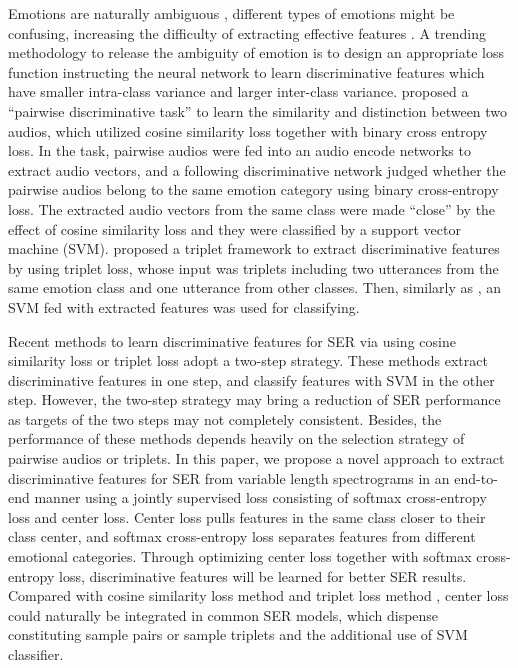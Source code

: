 \documentclass{article}
\begin{document}
Emotions are naturally ambiguous \cite{mower2009interpreting}, different types of emotions might be confusing, increasing the difficulty of extracting effective features \cite{chao2016long}. A trending methodology to release the ambiguity of emotion is to design an appropriate loss function instructing the neural network to learn discriminative features which have smaller intra-class variance and larger inter-class variance. \cite{lian2018pairwise} proposed a ``pairwise discriminative task'' to learn the similarity and distinction between two audios, which utilized cosine similarity loss together with binary cross entropy loss. In the task, pairwise audios were fed into an audio encode networks to extract audio vectors, and a following discriminative network judged whether the pairwise audios belong to the same emotion category using binary cross-entropy loss. The extracted audio vectors from the same class were made ``close'' by the effect of cosine similarity loss and they were classified by a support vector machine ({SVM}). \cite{huang2018speech} proposed a triplet framework to extract discriminative features by using triplet loss\cite{schroff2015facenet}, whose input was triplets including two utterances from the same emotion class and one utterance from other classes. Then, similarly as \cite{lian2018pairwise}, an SVM fed with extracted features was used for classifying.

Recent methods to learn discriminative features for SER via using cosine similarity loss\cite{lian2018pairwise} or triplet loss\cite{huang2018speech} adopt a two-step strategy. These methods extract discriminative features in one step, and classify features with SVM in the other step. However, the two-step strategy may bring a reduction of SER performance as targets of the two steps may not completely consistent. Besides, the performance of these methods depends heavily on the selection strategy of pairwise audios or triplets. In this paper, we propose a novel approach to extract discriminative features for SER from variable length spectrograms in an end-to-end manner using a jointly supervised loss consisting of softmax cross-entropy loss and center loss\cite{wen2016discriminative}. Center loss pulls features in the same class closer to their class center, and softmax cross-entropy loss separates features from different emotional categories. Through optimizing center loss together with softmax cross-entropy loss, discriminative features will be learned for better SER results. Compared with cosine similarity loss method \cite{lian2018pairwise} and triplet loss method \cite{huang2018speech}, center loss could naturally be integrated in common SER models, which dispense constituting sample pairs or sample triplets and the additional use of SVM classifier.
\end{document}
